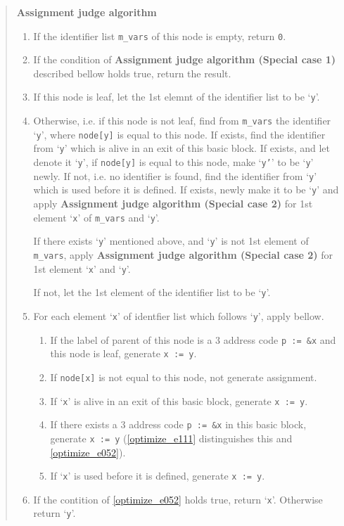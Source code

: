 \begin{quote}
{\bf Assignment judge algorithm}

\begin{enumerate}
\item If the identifier list {\tt{m\_vars}} of this node is empty,
      return {\tt{0}}.
\item  \label{optimize_e067}
      If the condition of
      {\bf Assignment judge algorithm (Special case 1) }
      described bellow holds true, return the result.
\item \label{optimize_e055}
      If this node is leaf, 
      let the 1st elemnt of the identifier list to be `{\tt{y}}'.
\item \label{optimize_e054}
      Otherwise, i.e. if this node is not leaf,
      find from {\tt{m\_vars}} the identifier `{\tt{y}}', where
      {\tt{node[y]}} is equal to this node. If exists, find the
      identifier from `{\tt{y}}' which is alive in an exit of this
      basic block. If exists, and let denote it `{\tt{y}}', 
      if {\tt{node[y]}} is equal to this node, make `{\tt{y'}}' to be
      `{\tt{y}}' newly. If not, i.e. no identifier is found, find
      the identifier from `{\tt{y}}' which is used before it is defined. 
      If exists, newly make it to be `{\tt{y}}' and apply
      {\bf Assignment judge algorithm (Special case 2)} for 1st element
      `{\tt{x}}' of {\tt{m\_vars}} and `{\tt{y}}'.

      If there exists `{\tt{y}}' mentioned above, and `{\tt{y}}' is
      not 1st element of {\tt{m\_vars}},
      apply {\bf Assignment judge algorithm (Special case 2)}
      for 1st element `{\tt{x}}' and  `{\tt{y}}'.

      If not, let the 1st element of the identifier list to be `{\tt{y}}'.
 \item 
      For each element `{\tt{x}}' of identfier list which follows `{\tt{y}}',
      apply bellow.
\begin{enumerate}
\item \label{optimize_e052}
      If the label of parent of this node is a 3 address code
      {\tt{p := \&x}} and this node is leaf, generate {\tt{x := y}}.
\item If {\tt{node[x]}} is not equal to this node, 
      not generate assignment.
\item \label{optimize_e053} 
      If `{\tt{x}}' is alive in an exit of this basic block,
      generate {\tt{x := y}}.
\item \label{optimize_e110} 
      If there exists a 3 address code {\tt{p := \&x}} in this
      basic block, generate {\tt{x := y}}
      (\ref{optimize_e111} distinguishes this and \ref{optimize_e052}).
\item If `{\tt{x}}' is used before it is defined, 
      generate {\tt{x := y}}.
\end{enumerate}

\item \label{optimize_e111}
If the contition of \ref{optimize_e052} holds true,
      return `{\tt{x}}'. Otherwise return `{\tt{y}}'. 
\end{enumerate}
\end{quote}

